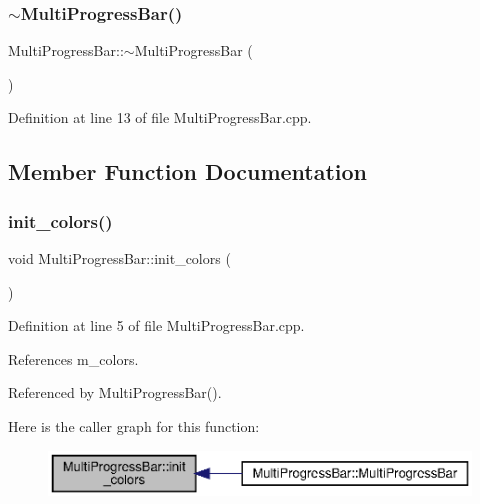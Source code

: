 \subsubsection{$\sim$\+Multi\+Progress\+Bar()}
{\footnotesize\ttfamily Multi\+Progress\+Bar\+::$\sim$\+Multi\+Progress\+Bar (\begin{DoxyParamCaption}{ }\end{DoxyParamCaption})}



Definition at line 13 of file Multi\+Progress\+Bar.\+cpp.



\subsection{Member Function Documentation}
\mbox{\label{classMultiProgressBar_ab6dc669eb38eecf874db34f4237418fb_ab6dc669eb38eecf874db34f4237418fb}} 
\subsubsection{init\+\_\+colors()}
{\footnotesize\ttfamily void Multi\+Progress\+Bar\+::init\+\_\+colors (\begin{DoxyParamCaption}{ }\end{DoxyParamCaption})\hspace{0.3cm}{\ttfamily [private]}}



Definition at line 5 of file Multi\+Progress\+Bar.\+cpp.



References m\+\_\+colors.



Referenced by Multi\+Progress\+Bar().

Here is the caller graph for this function\+:\nopagebreak
\begin{figure}[H]
\begin{center}
\leavevmode
\includegraphics[width=350pt]{classMultiProgressBar_ab6dc669eb38eecf874db34f4237418fb_ab6dc669eb38eecf874db34f4237418fb_icgraph}
\end{center}
\end{figure}
\mbox{\label{classMultiProgressBar_a58eef55ad6d5c7d769b3a402a2ef7b85_a58eef55ad6d5c7d769b3a402a2ef7b85}} 
